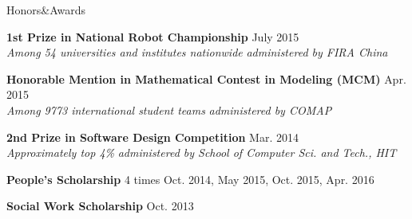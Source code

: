\documentclass{resume} %
\begin{document}
\begin{rSection}{Honors\&Awards}

{\bf 1st Prize in National Robot Championship} \hfill {July 2015} 
\\ {\em Among 54 universities and institutes nationwide} \hfill {\em administered by FIRA China}

{\bf Honorable Mention in Mathematical Contest in Modeling (MCM)} \hfill {Apr. 2015} 
\\ {\em Among 9773 international student teams} \hfill {\em administered by COMAP}

{\bf 2nd Prize in Software Design Competition} \hfill {Mar. 2014} 
\\ {\em Approximately top 4\%} \hfill {\em administered by School of Computer Sci. and Tech., HIT}

{\bf People's Scholarship} 4 times \hfill {Oct. 2014, May 2015, Oct. 2015, Apr. 2016} 

{\bf Social Work Scholarship} \hfill {Oct. 2013} 

\end{rSection}
\end{document}
